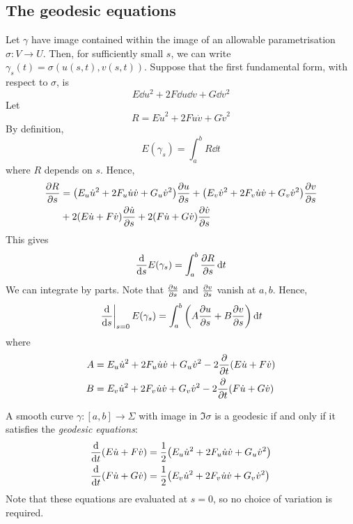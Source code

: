 \subsection{The geodesic equations}
Let \( \gamma \) have image contained within the image of an allowable parametrisation \( \sigma \colon V \to U \).
Then, for sufficiently small \( s \), we can write \( \gamma_s(t) = \sigma(u(s,t), v(s,t)) \).
Suppose that the first fundamental form, with respect to \( \sigma \), is
\[ E \dd{u}^2 + 2F \dd{u} \dd{v} + G \dd{v}^2 \]
Let
\[ R = E \dot u^2 + 2F \dot u \dot v + G \dot v^2 \]
By definition,
\[ E(\gamma_s) = \int_a^b R \dd{t} \]
where \( R \) depends on \( s \).
Hence,
\begin{align*}
	\pdv{R}{s} &= \qty(E_u \dot u^2 + 2F_u \dot u \dot v + G_u \dot v^2) \pdv{u}{s} + \qty(E_v \dot v^2 + 2F_v \dot u \dot v + G_v \dot v^2) \pdv{v}{s} \\
	&+ 2 (E \dot u + F \dot v) \pdv{\dot u}{s} + 2(F \dot u + G \dot v) \pdv{\dot v}{s}
\end{align*}
This gives
\[ \dv{s} E(\gamma_s) = \int_a^b \pdv{R}{s} \dd{t} \]
We can integrate by parts.
Note that \( \pdv{u}{s} \) and \( \pdv{v}{s} \) vanish at \( a,b \).
Hence,
\[ \eval{\dv{s}}_{s=0} E(\gamma_s) = \int_a^b \qty(A \pdv{u}{s} + B \pdv{v}{s}) \dd{t} \]
where
\begin{align*}
	A &= E_u \dot u^2 + 2F_u \dot u \dot v + G_u \dot v^2 - 2 \pdv{t} \qty(E \dot u + F \dot v) \\
	B &= E_v \dot u^2 + 2F_v \dot u \dot v + G_v \dot v^2 - 2 \pdv{t} \qty(F \dot u + G \dot v)
\end{align*}
\begin{corollary}
	A smooth curve \( \gamma \colon [a,b] \to \Sigma \) with image in \( \Im \sigma \) is a geodesic if and only if it satisfies the \textit{geodesic equations}:
	\begin{align*}
		\dv{t} \qty(E \dot u + F \dot v) &= \frac{1}{2} \qty( E_u \dot u^2 + 2F_u \dot u \dot v + G_u \dot v^2 ) \\
		\dv{t} \qty(F \dot u + G \dot v) &= \frac{1}{2} \qty( E_v \dot u^2 + 2F_v \dot u \dot v + G_v \dot v^2 )
	\end{align*}
	Note that these equations are evaluated at \( s = 0 \), so no choice of variation is required.
\end{corollary}
